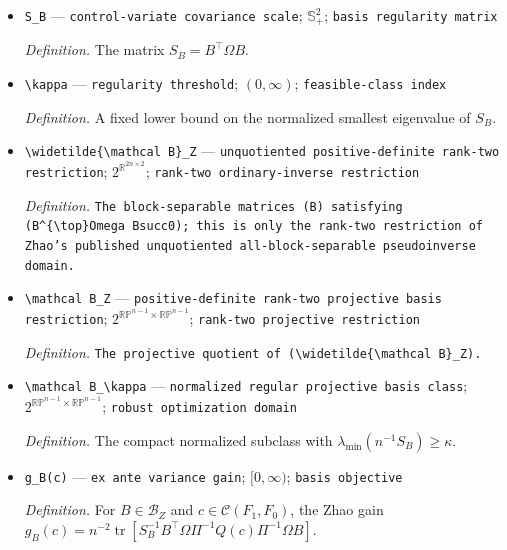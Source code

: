 \documentclass{article}
\begin{document}
\begin{itemize}
  \item \texttt{S\_\allowbreak{}B} --- \texttt{control-\allowbreak{}variate covariance scale}; \(\mathbb S_+^2\); \texttt{basis regularity matrix}
  \par\smallskip\noindent\emph{Definition.} The matrix \(S_B=B^{\top}\Omega B\).
  \item \texttt{\textbackslash{}\allowbreak{}kappa} --- \texttt{regularity threshold}; \((0,\infty)\); \texttt{feasible-\allowbreak{}class index}
  \par\smallskip\noindent\emph{Definition.} A fixed lower bound on the normalized smallest eigenvalue of \(S_B\).
  \item \texttt{\textbackslash{}\allowbreak{}widetilde\{\textbackslash{}\allowbreak{}mathcal B\}\allowbreak{}\_\allowbreak{}Z} --- \texttt{unquotiented positive-\allowbreak{}definite rank-\allowbreak{}two restriction}; \(2^{\mathbb R^{2n\times2}}\); \texttt{rank-\allowbreak{}two ordinary-\allowbreak{}inverse restriction}
  \par\smallskip\noindent\emph{Definition.} \texttt{The block-\allowbreak{}separable matrices (B) satisfying (B\textasciicircum{}\{\textbackslash{}\allowbreak{}top\}\allowbreak{}Omega Bsucc0);\allowbreak{} this is only the rank-\allowbreak{}two restriction of Zhao's published unquotiented all-\allowbreak{}block-\allowbreak{}separable pseudoinverse domain.}
  \item \texttt{\textbackslash{}\allowbreak{}mathcal B\_\allowbreak{}Z} --- \texttt{positive-\allowbreak{}definite rank-\allowbreak{}two projective basis restriction}; \(2^{\mathbb {RP}^{n-1}\times\mathbb {RP}^{n-1}}\); \texttt{rank-\allowbreak{}two projective restriction}
  \par\smallskip\noindent\emph{Definition.} \texttt{The projective quotient of (\textbackslash{}\allowbreak{}widetilde\{\textbackslash{}\allowbreak{}mathcal B\}\allowbreak{}\_\allowbreak{}Z).}
  \item \texttt{\textbackslash{}\allowbreak{}mathcal B\_\allowbreak{}\textbackslash{}\allowbreak{}kappa} --- \texttt{normalized regular projective basis class}; \(2^{\mathbb {RP}^{n-1}\times\mathbb {RP}^{n-1}}\); \texttt{robust optimization domain}
  \par\smallskip\noindent\emph{Definition.} The compact normalized subclass with \(\lambda_{\min}(n^{-1}S_B)\ge\kappa\).
  \item \texttt{g\_\allowbreak{}B(c)} --- \texttt{ex ante variance gain}; \([0,\infty)\); \texttt{basis objective}
  \par\smallskip\noindent\emph{Definition.} For \(B\in\mathcal B_Z\) and \(c\in\mathcal C(F_1,F_0)\), the Zhao gain \(g_B(c)=n^{-2}\operatorname{tr}\!\left[S_B^{-1}B^{\top}\Omega\Pi^{-1}Q(c)\Pi^{-1}\Omega B\right]\).

\end{itemize}
\end{document}

